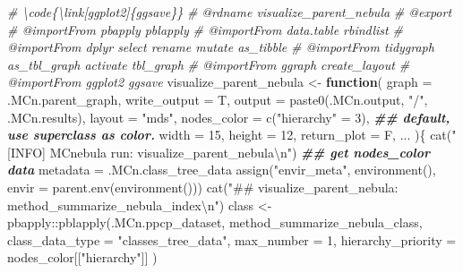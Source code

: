 \documentclass[
]{article}
\newenvironment{Shaded}{\begin{snugshade}}{\end{snugshade}}
\newcommand{\AttributeTok}[1]{\textcolor[rgb]{0.77,0.63,0.00}{#1}}
\newcommand{\CommentTok}[1]{\textcolor[rgb]{0.56,0.35,0.01}{\textit{#1}}}
\newcommand{\ControlFlowTok}[1]{\textcolor[rgb]{0.13,0.29,0.53}{\textbf{#1}}}
\newcommand{\DecValTok}[1]{\textcolor[rgb]{0.00,0.00,0.81}{#1}}
\newcommand{\DocumentationTok}[1]{\textcolor[rgb]{0.56,0.35,0.01}{\textbf{\textit{#1}}}}
\newcommand{\FunctionTok}[1]{\textcolor[rgb]{0.00,0.00,0.00}{#1}}
\newcommand{\NormalTok}[1]{#1}
\newcommand{\OtherTok}[1]{\textcolor[rgb]{0.56,0.35,0.01}{#1}}
\newcommand{\SpecialCharTok}[1]{\textcolor[rgb]{0.00,0.00,0.00}{#1}}
\newcommand{\StringTok}[1]{\textcolor[rgb]{0.31,0.60,0.02}{#1}}
\begin{document}
\begin{Shaded}
\begin{Highlighting}[]
\CommentTok{\#\textquotesingle{}  \textbackslash{}code\{\textbackslash{}link[ggplot2]\{ggsave\}\}}
\CommentTok{\#\textquotesingle{} @rdname visualize\_parent\_nebula}
\CommentTok{\#\textquotesingle{} @export }
\CommentTok{\#\textquotesingle{} @importFrom pbapply pblapply}
\CommentTok{\#\textquotesingle{} @importFrom data.table rbindlist}
\CommentTok{\#\textquotesingle{} @importFrom dplyr select rename mutate as\_tibble}
\CommentTok{\#\textquotesingle{} @importFrom tidygraph as\_tbl\_graph activate tbl\_graph}
\CommentTok{\#\textquotesingle{} @importFrom ggraph create\_layout}
\CommentTok{\#\textquotesingle{} @importFrom ggplot2 ggsave}
\NormalTok{visualize\_parent\_nebula }\OtherTok{\textless{}{-}}
  \ControlFlowTok{function}\NormalTok{(}
           \AttributeTok{graph =}\NormalTok{ .MCn.parent\_graph,}
           \AttributeTok{write\_output =}\NormalTok{ T,}
           \AttributeTok{output =} \FunctionTok{paste0}\NormalTok{(.MCn.output, }\StringTok{"/"}\NormalTok{, .MCn.results),}
           \AttributeTok{layout =} \StringTok{"mds"}\NormalTok{,}
           \AttributeTok{nodes\_color =} \FunctionTok{c}\NormalTok{(}\StringTok{"hierarchy"} \OtherTok{=} \DecValTok{3}\NormalTok{), }\DocumentationTok{\#\# default, use superclass as color.}
           \AttributeTok{width =} \DecValTok{15}\NormalTok{,}
           \AttributeTok{height =} \DecValTok{12}\NormalTok{,}
           \AttributeTok{return\_plot =}\NormalTok{ F,}
\NormalTok{           ...}
\NormalTok{           )\{}
    \FunctionTok{cat}\NormalTok{(}\StringTok{"[INFO] MCnebula run: visualize\_parent\_nebula}\SpecialCharTok{\textbackslash{}n}\StringTok{"}\NormalTok{)}
    \DocumentationTok{\#\# get nodes\_color data}
\NormalTok{    metadata }\OtherTok{=}\NormalTok{ .MCn.class\_tree\_data}
    \FunctionTok{assign}\NormalTok{(}\StringTok{"envir\_meta"}\NormalTok{, }\FunctionTok{environment}\NormalTok{(), }\AttributeTok{envir =} \FunctionTok{parent.env}\NormalTok{(}\FunctionTok{environment}\NormalTok{()))}
    \FunctionTok{cat}\NormalTok{(}\StringTok{"\#\# visualize\_parent\_nebula: method\_summarize\_nebula\_index}\SpecialCharTok{\textbackslash{}n}\StringTok{"}\NormalTok{)}
\NormalTok{    class }\OtherTok{\textless{}{-}}\NormalTok{ pbapply}\SpecialCharTok{::}\FunctionTok{pblapply}\NormalTok{(.MCn.ppcp\_dataset, method\_summarize\_nebula\_class, }
                               \AttributeTok{class\_data\_type =} \StringTok{"classes\_tree\_data"}\NormalTok{,}
                               \AttributeTok{max\_number =} \DecValTok{1}\NormalTok{,}
                               \AttributeTok{hierarchy\_priority =}\NormalTok{ nodes\_color[[}\StringTok{"hierarchy"}\NormalTok{]] )}

\end{Highlighting}
\end{Shaded}
\end{document}
